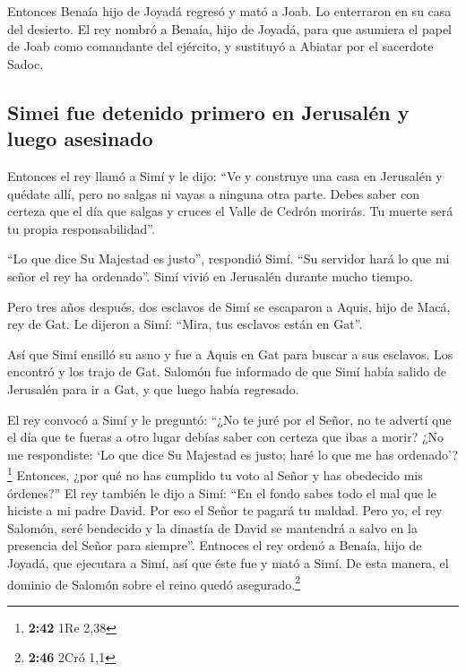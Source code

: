  Entonces Benaía hijo de Joyadá regresó y mató a Joab. Lo
enterraron en su casa del desierto.  El rey nombró a
Benaía, hijo de Joyadá, para que asumiera el papel de Joab como
comandante del ejército, y sustituyó a Abiatar por el sacerdote Sadoc.

\hypertarget{simei-fue-detenido-primero-en-jerusaluxe9n-y-luego-asesinado}{%
\subsection{Simei fue detenido primero en Jerusalén y luego
asesinado}\label{simei-fue-detenido-primero-en-jerusaluxe9n-y-luego-asesinado}}

 Entonces el rey llamó a Simí y le dijo: ``Ve y construye
una casa en Jerusalén y quédate allí, pero no salgas ni vayas a ninguna
otra parte.  Debes saber con certeza que el día que
salgas y cruces el Valle de Cedrón morirás. Tu muerte será tu propia
responsabilidad''.

 ``Lo que dice Su Majestad es justo'', respondió Simí.
``Su servidor hará lo que mi señor el rey ha ordenado''. Simí vivió en
Jerusalén durante mucho tiempo.

 Pero tres años después, dos esclavos de Simí se
escaparon a Aquis, hijo de Macá, rey de Gat. Le dijeron a Simí: ``Mira,
tus esclavos están en Gat''.

 Así que Simí ensilló su asno y fue a Aquis en Gat para
buscar a sus esclavos. Los encontró y los trajo de Gat. 
Salomón fue informado de que Simí había salido de Jerusalén para ir a
Gat, y que luego había regresado.

 El rey convocó a Simí y le preguntó: ``¿No te juré por
el Señor, no te advertí que el día que te fueras a otro lugar debías
saber con certeza que ibas a morir? ¿No me respondiste: `Lo que dice Su
Majestad es justo; haré lo que me has ordenado'? \footnote{\textbf{2:42}
  1Re 2,38}  Entonces, ¿por qué no has cumplido tu voto
al Señor y has obedecido mis órdenes?''  El rey también
le dijo a Simí: ``En el fondo sabes todo el mal que le hiciste a mi
padre David. Por eso el Señor te pagará tu maldad.  Pero
yo, el rey Salomón, seré bendecido y la dinastía de David se mantendrá a
salvo en la presencia del Señor para siempre''.  Entnoces
el rey ordenó a Benaía, hijo de Joyadá, que ejecutara a Simí, así que
éste fue y mató a Simí. De esta manera, el dominio de Salomón sobre el
reino quedó asegurado.\footnote{\textbf{2:46} 2Cró 1,1}

